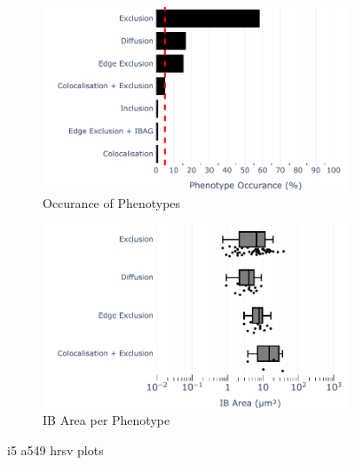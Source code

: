 \begin{figure}
    \begin{subfigure}{0.5\textwidth}
        \includegraphics[width=1\linewidth]{09. Chapter 4/Figs/02. Infection/03. IFIT5/01. bar_i5_a549.pdf} 
        \caption[]{Occurance of Phenotypes}
    \end{subfigure}
    \begin{subfigure}{0.5\textwidth}
        \includegraphics[width=1\linewidth]{09. Chapter 4/Figs/02. Infection/03. IFIT5/02. box_i5_a549.pdf}
        \caption[]{IB Area per Phenotype}
    \end{subfigure}
    \caption[i5 a549 hrsv plots]{i5 a549 hrsv plots}
    \label{fig:i5 a549 hrsv plots}
\end{figure}

